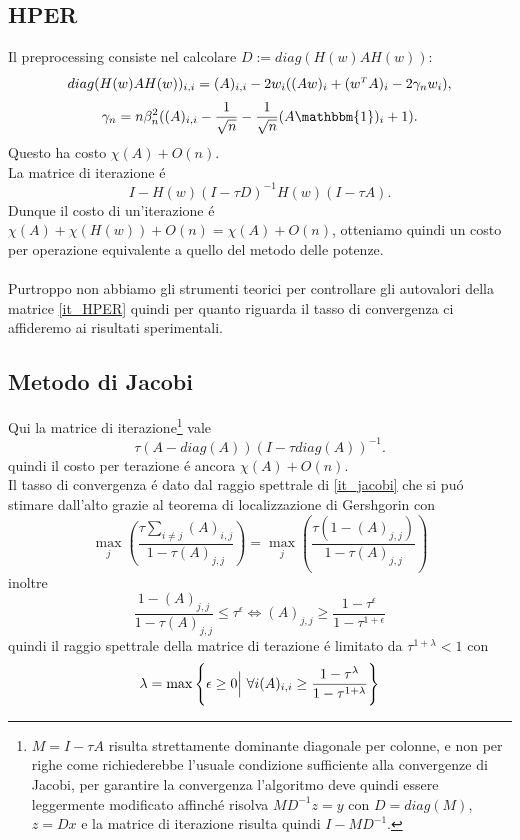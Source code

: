 \documentclass[12pt,a4paper]{amsart}
\numberwithin{equation}{section}
\theoremstyle{plain}
\theoremstyle{definition}
\newcommand{\tr}{^{\mathsmaller T}}
\newcommand{\ones}{\mathbbm{1}}
\begin{document}
\subsection{HPER}
Il preprocessing consiste nel calcolare $D:=diag(H(w)AH(w))$:
\begin{equation}
diag(H(w) A H(w))_{i,i}=(A)_{i,i}-2 w_i ((Aw)_i +(w\tr A)_i-2 \gamma_n w_i),
\end{equation}
\begin{equation}
\gamma_n=n\beta_n^2((A)_{i,i}-\frac{1}{\sqrt{n}}-\frac{1}{\sqrt{n}}(A\ones)_i +1).
\end{equation}
Questo ha costo $\chi(A)+O(n)$.
\\
La matrice di iterazione \'e
\begin{equation}
I-H(w)(I-\tau D)^{-1}H(w)(I-\tau A). \label{it_HPER}
\end{equation}
Dunque il costo di un'iterazione \'e $\chi(A)+\chi(H(w))+O(n)= \chi(A) + O(n)$, otteniamo quindi un costo per operazione equivalente a quello del metodo delle potenze.\\
\\
Purtroppo non abbiamo gli strumenti teorici per controllare gli autovalori della matrice \eqref{it_HPER} quindi per quanto riguarda il tasso di convergenza ci affideremo ai risultati sperimentali.
\subsection{Metodo di Jacobi}
Qui la matrice di iterazione\footnote{$M=I-\tau A$ risulta strettamente dominante diagonale per colonne, e non per righe come richiederebbe l'usuale condizione sufficiente alla convergenze di Jacobi, per garantire la convergenza l'algoritmo deve quindi essere leggermente modificato affinch\'e risolva $MD^{-1}z=y$ con $D=diag(M)$, $z=Dx$ e la matrice di iterazione risulta quindi $I-MD^{-1}$.} vale
\begin{equation}
\tau(A-diag(A))(I-\tau diag(A))^{-1}. \label{it_jacobi}
\end{equation}
quindi il costo per terazione \'e ancora $\chi(A)+O(n)$.
\\
Il tasso di convergenza \'e dato dal raggio spettrale di \eqref{it_jacobi} che si pu\'o stimare dall'alto grazie al teorema di localizzazione di Gershgorin con
\begin{equation}
\max_j\left(\frac{\tau \sum_{i\neq j} (A)_{i,j}}{1-\tau (A)_{j,j}}\right)=\max_j\left(\frac{\tau(1-(A)_{j,j})}{1-\tau (A)_{j,j}}\right)
\end{equation}
inoltre
\begin{equation}
\frac{1-(A)_{j,j}}{1-\tau (A)_{j,j}}\leq \tau^\epsilon \iff (A)_{j,j}\geq \frac{1-\tau^\epsilon}{1-\tau^{1+\epsilon}}
\end{equation}
quindi il raggio spettrale della matrice di terazione \'e limitato da $\tau^{1+\lambda}<1$ con
\begin{equation}
\lambda=\max \left\{\epsilon \geq 0 \Big{ |} \ \forall i (A)_{i,i} \geq  \frac{1-\tau^\lambda}{1-\tau^{1+\lambda}} \right\}
\end{equation}
\end{document}
